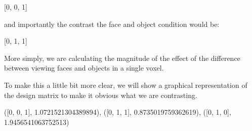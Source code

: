\documentclass[letterpaper,10pt,english]{sphinxmanual}
\begin{document}
{[}0, 0, 1{]}

and importantly the contrast  the face and object condition would be:

{[}0, 1, \sphinxhyphen{}1{]}

More simply, we are calculating the magnitude of the effect of the difference between viewing faces and objects in a single voxel.

To make this a little bit more clear, we will show a graphical representation of the design matrix to make it obvious what we are contrasting.

\begin{sphinxVerbatim}[commandchars=\\\{\}]

  \PYG{p}{[}  \PYG{p}{]}
  \PYG{p}{[}  \PYG{p}{]}
  \PYG{p}{[}  \PYG{p}{]}

     \PYG{p}{[}  \PYG{p}{]}
\end{sphinxVerbatim}

\begin{sphinxVerbatim}[commandchars=\\\{\}]
\PYGZob{}(\PYGZsq{}[0, 0, 1]\PYGZsq{}, 1.0721521304389894),
 (\PYGZsq{}[0, 1, \PYGZhy{}1]\PYGZsq{}, 0.8735019759362619),
 (\PYGZsq{}[0, 1, 0]\PYGZsq{}, 1.9456541063752513)\PYGZcb{}
\end{sphinxVerbatim}

\noindent{}
\end{document}
